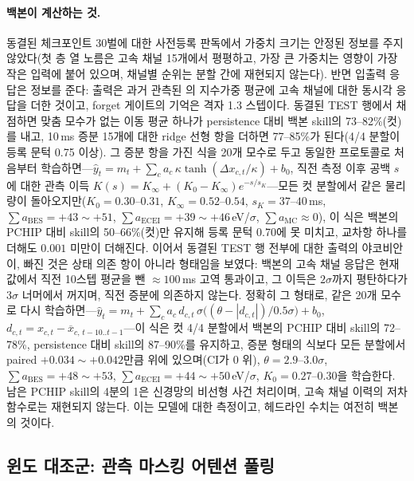 \documentclass[10pt,a4paper]{article}
\begin{document}
\paragraph{백본이 계산하는 것.}
동결된 \seqv{} 체크포인트 30벌에 대한 사전등록 판독에서 가중치 크기는 안정된
정보를 주지 않았다(첫 층 열 노름은 고속 채널 15개에서 평평하고, 가장 큰 가중치는
영향이 가장 작은 입력에 붙어 있으며, 채널별 순위는 분할 간에 재현되지 않는다).
반면 입출력 응답은 정보를 준다: \Ti{} 출력은 과거 관측된 \Ti{}의 지수가중 평균에
고속 채널에 대한 동시각 응답을 더한 것이고, forget 게이트의 기억은 격자 1.3
스텝이다. 동결된 TEST 행에서 채점하면 맞춤 모수가 없는 이동 평균 하나가
persistence 대비 백본 skill의 73--82\%(컷)를 내고, 10\,ms 증분 15개에 대한 ridge
선형 항을 더하면 77--85\%가 된다(4/4 분할이 등록 문턱 0.75 이상). 그 증분 항을
가진 식을 20개 모수로 두고 동일한 프로토콜로 처음부터 학습하면---$\hat y_t = m_t +
\sum_c a_c\,\kappa \tanh(\Delta x_{c,t}/\kappa) + b_0$, 직전 측정 이후 공백 $s$에
대한 관측 이득 $K(s) = K_\infty + (K_0 - K_\infty)e^{-s/s_K}$---모든 컷 분할에서 같은
물리량이 돌아오지만($K_0 = 0.30$--$0.31$, $K_\infty = 0.52$--$0.54$, $s_K =
37$--$40$\,ms, $\sum a_{\mathrm{BES}} = +43 \sim +51$, $\sum a_{\mathrm{ECEI}} = +39
\sim +46$\,eV/$\sigma$, $\sum a_{\mathrm{MC}} \approx 0$), 이 식은 백본의 PCHIP 대비
skill의 50--66\%(컷)만 유지해 등록 문턱 0.70에 못 미치고, 교차항 하나를 더해도
$0.001$ 미만이 더해진다. 이어서 동결된 TEST 행 전부에 대한 출력의 야코비안이,
빠진 것은 상태 의존 항이 아니라 형태임을 보였다: 백본의 고속 채널 응답은 현재값에서
직전 10스텝 평균을 뺀 ${\approx}100$\,ms 고역 통과이고, 그 이득은 $2\sigma$까지
평탄하다가 $3\sigma$ 너머에서 꺼지며, 직전 증분에 의존하지 않는다. 정확히 그
형태로, 같은 20개 모수로 다시 학습하면---$\hat y_t = m_t + \sum_c a_c\,d_{c,t}\,
\sigma\!\big((\theta - |d_{c,t}|)/0.5\sigma\big) + b_0$, $d_{c,t} = x_{c,t} -
\overline{x}_{c,\,t-10..t-1}$---이 식은 컷 4/4 분할에서 백본의 PCHIP 대비 skill의
72--78\%, persistence 대비 skill의 87--90\%를 유지하고, 증분 형태의 식보다 모든
분할에서 paired $+0.034 \sim +0.042$만큼 위에 있으며(CI가 0 위), $\theta = 2.9$--$3.0\sigma$,
$\sum a_{\mathrm{BES}} = +48 \sim +53$, $\sum a_{\mathrm{ECEI}} = +44 \sim
+50$\,eV/$\sigma$, $K_0 = 0.27$--$0.30$을 학습한다. 남은 PCHIP skill의 4분의 1은
신경망의 비선형 사건 처리이며, 고속 채널 이력의 저차 함수로는 재현되지 않는다. 이는
모델에 대한 측정이고, 헤드라인 수치는 여전히 백본의 것이다.

\subsection{윈도 대조군: 관측 마스킹 어텐션 풀링}
\label{sec:model:window}
\end{document}

